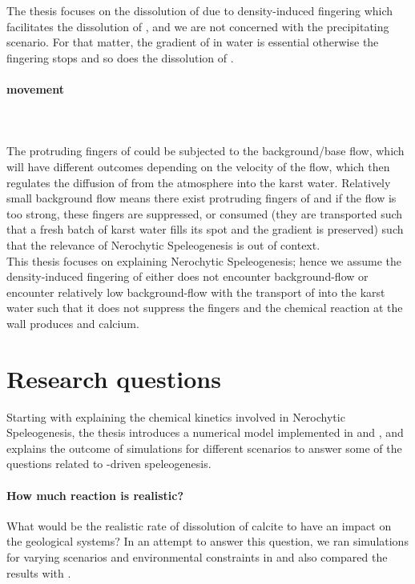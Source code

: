 The thesis focuses on the dissolution of  due to density-induced fingering which facilitates the dissolution of , 
and we are not concerned with the precipitating scenario. For that matter, the gradient of  in water is essential otherwise the fingering 
stops and so does the dissolution of .

\paragraph*{ movement}\mbox{}\\ \\
The protruding fingers of  could be subjected to the background/base flow, which will have different outcomes depending on 
the velocity of the flow, which then regulates the diffusion of  from the atmosphere into the karst water. Relatively small 
background flow means there exist protruding fingers of  and if the flow is too strong, these fingers are suppressed, or 
consumed (they are transported such that a fresh batch of karst water fills its spot and the gradient is preserved) such 
that the relevance of Nerochytic Speleogenesis is out of context. \\

This thesis focuses on explaining Nerochytic Speleogenesis; hence we assume the density-induced fingering of  either does not encounter 
background-flow or encounter relatively low background-flow with the transport of  into the karst water such that it does not suppress 
the fingers and the chemical reaction at the wall produces  and calcium.

\section {Research questions}
Starting with explaining the chemical kinetics involved in Nerochytic Speleogenesis, the thesis introduces a numerical model 
implemented in \DuMuX and \MATLAB , and explains the outcome of simulations for different scenarios to answer some of the questions 
related to -driven speleogenesis.\\

\paragraph*{How much reaction is realistic?} What would be the realistic rate of dissolution of calcite to have an impact 
on the geological systems? In an attempt to answer this question, we ran simulations for varying scenarios and environmental constraints in \DuMuX and
also compared the results with \MATLAB. 

